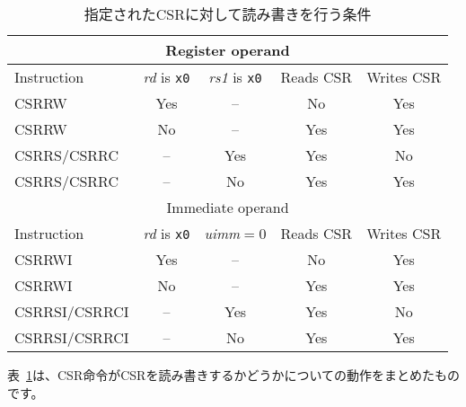 \begin{table}
  \centering
  \begin{tabular}{|l|c|c|c|c|}
    \hline
    \multicolumn{5}{|c|}{Register operand} \\
    \hline
    Instruction & \textit{rd} is \texttt{x0}
                      & \textit{rs1} is \texttt{x0}
                            & Reads CSR & Writes CSR \\
    \hline
    CSRRW       & Yes & --  & No  & Yes \\
    CSRRW       & No  & --  & Yes & Yes \\
    CSRRS/CSRRC & --  & Yes & Yes & No \\
    CSRRS/CSRRC & --  & No  & Yes & Yes \\
    \hline
    \multicolumn{5}{|c|}{Immediate operand} \\
    \hline
    Instruction & \textit{rd} is \texttt{x0}
                        & \textit{uimm}$=$0
                              & Reads CSR & Writes CSR \\
    \hline
    CSRRWI        & Yes & --  & No  & Yes \\
    CSRRWI        & No  & --  & Yes & Yes \\
    CSRRSI/CSRRCI & --  & Yes & Yes & No \\
    CSRRSI/CSRRCI & --  & No  & Yes & Yes \\
    \hline
  \end{tabular}
\begin{comment}
  \caption{Conditions determining whether a CSR instruction reads or writes
    the specified CSR.}
\end{comment}
  \caption{指定されたCSRに対して読み書きを行う条件}
  \label{tab:csrsideeffects}
\end{table}

\begin{comment}
Table~\ref{tab:csrsideeffects} summarizes the behavior of the CSR
instructions with respect to whether they read and/or write the CSR.
\end{comment}

表~\ref{tab:csrsideeffects}は、CSR命令がCSRを読み書きするかどうかについての動作をまとめたものです。

\begin{comment}
For any event or consequence that occurs due to a CSR having a particular
value, if a write to the CSR gives it that value, the resulting event or
consequence is said to be an \emph{indirect effect} of the write.
Indirect effects of a CSR write are not considered by the RISC-V ISA to
be side effects of that write.
\end{comment}

